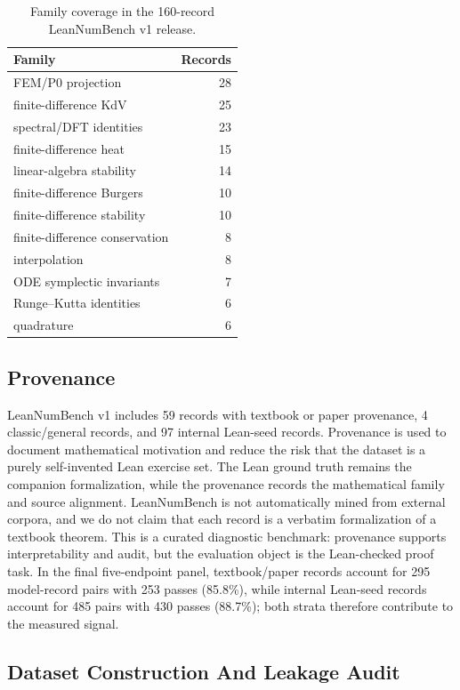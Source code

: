 \documentclass{article}
\begin{document}
\begin{table}[H]
\centering
\caption{Family coverage in the 160-record LeanNumBench v1 release.}
\label{tab:families}
\small
\begin{tabular}{lr}
\toprule
Family & Records\\
\midrule
FEM/P0 projection & 28\\
finite-difference KdV & 25\\
spectral/DFT identities & 23\\
finite-difference heat & 15\\
linear-algebra stability & 14\\
finite-difference Burgers & 10\\
finite-difference stability & 10\\
finite-difference conservation & 8\\
interpolation & 8\\
ODE symplectic invariants & 7\\
Runge--Kutta identities & 6\\
quadrature & 6\\
\bottomrule
\end{tabular}
\end{table}

\subsection{Provenance}

LeanNumBench v1 includes 59 records with textbook or paper provenance, 4
classic/general records, and 97 internal Lean-seed records. Provenance is used
to document mathematical motivation and reduce the risk that the dataset is a
purely self-invented Lean exercise set. The Lean ground truth remains the
companion formalization, while the provenance records the mathematical family
and source alignment. LeanNumBench is not automatically mined from external
corpora, and we do not claim that each record is a verbatim formalization of a
textbook theorem. This is a curated diagnostic benchmark: provenance supports
interpretability and audit, but the evaluation object is the Lean-checked
proof task. In the final five-endpoint panel, textbook/paper records account for
295 model-record pairs with 253 passes (85.8\%), while internal Lean-seed
records account for 485 pairs with 430 passes (88.7\%); both strata therefore
contribute to the measured signal.

\subsection{Dataset Construction And Leakage Audit}
\end{document}
